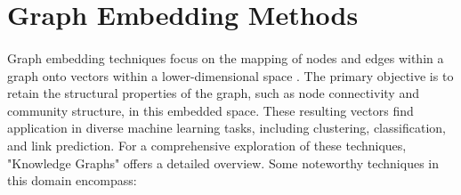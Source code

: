 \section{Graph Embedding Methods}
    \paragraph{}Graph embedding techniques focus on the mapping of nodes and edges within a graph onto vectors within a lower-dimensional space \cite{hogan_knowledge_2022}. The primary objective is to retain the structural properties of the graph, such as node connectivity and community structure, in this embedded space. These resulting vectors find application in diverse machine learning tasks, including clustering, classification, and link prediction. For a comprehensive exploration of these techniques, "Knowledge Graphs" offers a detailed overview. Some noteworthy techniques in this domain encompass:

